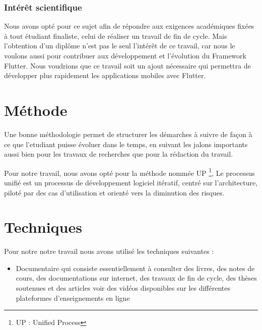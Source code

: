 \documentclass[a4paper,12pt]{report}
\begin{document}
                \subsubsection*{Intérêt scientifique}
                    Nous avons opté pour ce sujet afin de répondre aux exigences académiques fixées à tout étudiant finaliste, 
                    celui de réaliser un travail de fin de cycle. Mais l’obtention d’un diplôme n’est pas le seul l'intérêt de ce travail, 
                    car nous le voulons aussi pour contribuer aux développement et l'évolution du Framework Flutter.  
                    Nous voudrions que ce travail 
                    soit un ajout nécessaire qui permettra de développer plus rapidement les applications mobiles avec Flutter.
            
            \section*{Méthode}
                Une bonne méthodologie permet de structurer les démarches à suivre de façon à ce que l’etudiant puisse évoluer 
                dans le temps, en suivant les jalons importants aussi bien pour les travaux de recherches que pour la 
                rédaction du travail.

                Pour notre travail, nous avons opté pour la méthode nommée UP \footnote{UP : Unified Process},
                Le processus unifié est un processus de développement logiciel itératif, centré sur l'architecture, 
                piloté par des cas d'utilisation et orienté vers la diminution des risques.
            
            \section*{Techniques}
                Pour notre notre travail nous avons utilisé les techniques suivantes :
                \begin{itemize}
                    \item Documentaire qui consiste essentiellement à consulter des livres, 
                          des notes de cours, des documentations sur internet, des travaux de fin de cycle, 
                          des thèses soutenues et des articles voir des vidéos disponibles sur les différentes plateformes 
                          d’enseignements en ligne
                \end{itemize}

            
\end{document}
